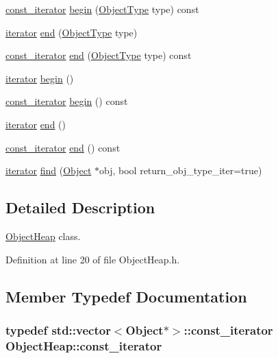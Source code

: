 \begin{DoxyCompactItemize}
\item 
\hyperlink{classObjectHeap_af07744bc1ca895917429540266b2b9bd}{const\-\_\-iterator} \hyperlink{classObjectHeap_ac0c481b7e2d2d1901f73073d453b9b35}{begin} (\hyperlink{BasicTypes_8h_a842c5e2e69277690b064bf363c017980}{Object\-Type} type) const 
\item 
\hyperlink{classObjectHeap_a5be9fee885fae47d7dc090899d9fb7bd}{iterator} \hyperlink{classObjectHeap_a6b530e67b5383a29be3699f891c7482b}{end} (\hyperlink{BasicTypes_8h_a842c5e2e69277690b064bf363c017980}{Object\-Type} type)
\item 
\hyperlink{classObjectHeap_af07744bc1ca895917429540266b2b9bd}{const\-\_\-iterator} \hyperlink{classObjectHeap_a9e0ace11a93deb7163989cf6e3f4e88f}{end} (\hyperlink{BasicTypes_8h_a842c5e2e69277690b064bf363c017980}{Object\-Type} type) const 
\item 
\hyperlink{classObjectHeap_a5be9fee885fae47d7dc090899d9fb7bd}{iterator} \hyperlink{classObjectHeap_ae7be29d4f5049397b3c2dff7bd27016b}{begin} ()
\item 
\hyperlink{classObjectHeap_af07744bc1ca895917429540266b2b9bd}{const\-\_\-iterator} \hyperlink{classObjectHeap_aa27cac54482c7bf5aab561eddbcaa97a}{begin} () const 
\item 
\hyperlink{classObjectHeap_a5be9fee885fae47d7dc090899d9fb7bd}{iterator} \hyperlink{classObjectHeap_ab225091de1b80c054a545bab2c11b0fe}{end} ()
\item 
\hyperlink{classObjectHeap_af07744bc1ca895917429540266b2b9bd}{const\-\_\-iterator} \hyperlink{classObjectHeap_a366c6aedfc59ff2f84b70e68e1a4d266}{end} () const 
\item 
\hyperlink{classObjectHeap_a5be9fee885fae47d7dc090899d9fb7bd}{iterator} \hyperlink{classObjectHeap_a78e16a9ebe6bfe6c10f356fdd5cb5704}{find} (\hyperlink{classObject}{Object} $\ast$obj, bool return\-\_\-obj\-\_\-type\-\_\-iter=true)
\end{DoxyCompactItemize}


\subsection{Detailed Description}
\hyperlink{classObjectHeap}{Object\-Heap} class. 

Definition at line 20 of file Object\-Heap.\-h.



\subsection{Member Typedef Documentation}
\hypertarget{classObjectHeap_af07744bc1ca895917429540266b2b9bd}{
\subsubsection[{const\-\_\-iterator}]{\setlength{\rightskip}{0pt plus 5cm}typedef std\-::vector$<${\bf Object}$\ast$$>$\-::{\bf const\-\_\-iterator} {\bf Object\-Heap\-::const\-\_\-iterator}}}\label{classObjectHeap_af07744bc1ca895917429540266b2b9bd}


